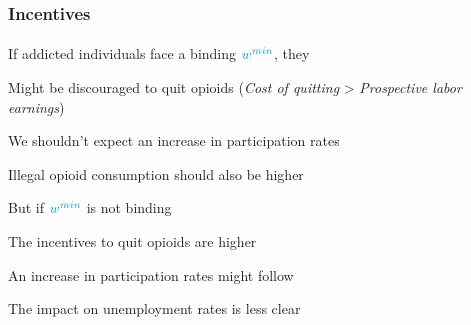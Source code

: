 \begin{frame}

    \frametitle{Incentives} %
    \framesubtitle{}  %
    \rmfamily %
    
    \begin{wideitemize}
        \item If addicted individuals face a binding \(\textcolor{fblu}{w^{min}}\), they
        \vspace{9pt}
        \begin{wideitemize}
            \item[\textcolor{fblu}{\textbullet}] Might be discouraged to quit opioids (\textit{Cost of quitting} > \textit{Prospective labor earnings})
            \item[\textcolor{fblu}{\textbullet}] We shouldn't expect an increase in participation rates
            \item[\textcolor{fblu}{\textbullet}] Illegal opioid consumption should also be higher
        \end{wideitemize}
        \item But if \(\textcolor{fblu}{w^{min}}\) is not binding
        \vspace{9pt}
        \begin{wideitemize}
            \item[\textcolor{fblu}{\textbullet}] The incentives to quit opioids are higher
            \item[\textcolor{fblu}{\textbullet}] An increase in participation rates might follow
            \item[\textcolor{fblu}{\textbullet}] The impact on unemployment rates is less clear
        \end{wideitemize}
    \end{wideitemize}
    
\end{frame}


